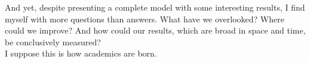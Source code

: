 And yet, despite presenting a complete model with some interesting results, I find myself with more questions than answers. What have we overlooked? Where could we improve? And how could our results, which are broad in space and time, be conclusively measured?
\\
\indent I suppose this is how academics are born.
%
%
%
%
%
